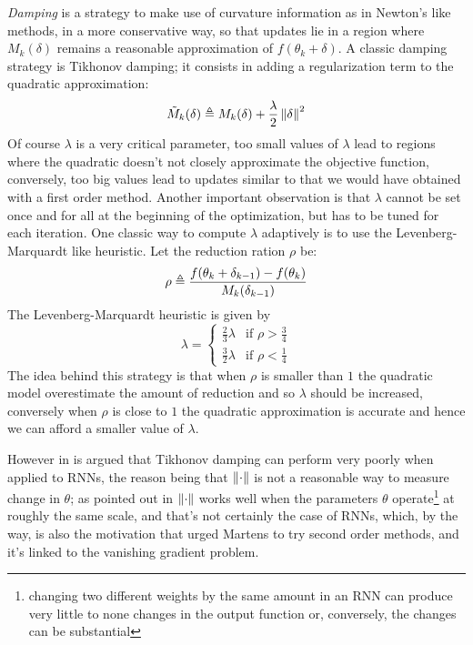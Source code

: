 \textit{Damping} is a strategy to make use of curvature information as in Newton's like methods, in a more conservative way, so that updates lie in a region where $M_k(\delta)$ remains a reasonable approximation of $f(\theta_k+\delta)$. 
A classic damping strategy is Tikhonov damping; it consists in adding a regularization term to the quadratic approximation:
\begin{equation}
 \tilde{M}_k(\delta) \triangleq  M_k(\delta) + \frac{\lambda}{2} \left\Vert \delta \right\Vert^2
\end{equation}
Of course $\lambda$ is a very critical parameter, too small values of $\lambda$ lead to regions where the quadratic doesn't not closely approximate the objective function, conversely, too big values lead to updates similar to that we would have obtained with a first order method. Another important observation is that $\lambda$ cannot be set once and for all at the beginning of the optimization, but has to be tuned for each iteration. One classic way to compute $\lambda$ adaptively is to use the Levenberg-Marquardt like heuristic.
Let the reduction ration $\rho$ be:
\begin{equation}
 \rho \triangleq \frac{f(\theta_k + \delta_{k-1})-f(\theta_k)}{M_k(\delta_{k-1})}
\end{equation}
The Levenberg-Marquardt  heuristic is given by
\begin{equation} 
 \lambda = 
 \begin{cases} 
    \frac{2}{3}\lambda &\mbox{if } \rho > \frac{3}{4} \\ 
    \frac{3}{2}\lambda &\mbox{if } \rho < \frac{1}{4} 
  \end{cases} 
\end{equation}
The idea behind this strategy is that when $\rho$ is smaller than $1$ the quadratic model overestimate the amount of reduction and so $\lambda$ should be increased, conversely when $\rho$ is close to $1$ the quadratic approximation is accurate and hence we can afford a smaller value of $\lambda$.

However in \cite{hessianFree} is argued that Tikhonov damping can perform very poorly when applied to RNNs, the reason being that $\left\Vert \cdot \right\Vert$ is not a reasonable way to measure change in $\theta$; as pointed out in \cite{hessianFree} $\left\Vert \cdot \right\Vert$ works well when the parameters $\theta$ operate\footnote{changing two different weights by the same amount in an RNN can produce very little to none changes in the output function or, conversely, the changes can be substantial} at roughly the same scale, and that's not certainly the case of RNNs, which, by the way, is also the motivation that urged Martens to try second order methods, and it's linked to the vanishing gradient problem. 

